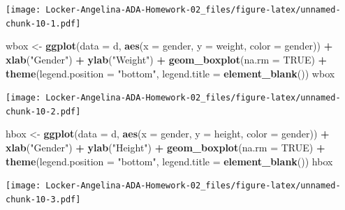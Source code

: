 \documentclass[]{article}
\newenvironment{Shaded}{\begin{snugshade}}{\end{snugshade}}
\newcommand{\KeywordTok}[1]{\textcolor[rgb]{0.13,0.29,0.53}{\textbf{#1}}}
\newcommand{\DataTypeTok}[1]{\textcolor[rgb]{0.13,0.29,0.53}{#1}}
\newcommand{\StringTok}[1]{\textcolor[rgb]{0.31,0.60,0.02}{#1}}
\newcommand{\OtherTok}[1]{\textcolor[rgb]{0.56,0.35,0.01}{#1}}
\newcommand{\OperatorTok}[1]{\textcolor[rgb]{0.81,0.36,0.00}{\textbf{#1}}}
\newcommand{\NormalTok}[1]{#1}
\begin{document}
\texttt{[image: Locker-Angelina-ADA-Homework-02\_files/figure-latex/unnamed-chunk-10-1.pdf]}

\begin{Shaded}
\begin{Highlighting}[]
\NormalTok{wbox <-}\StringTok{ }\KeywordTok{ggplot}\NormalTok{(}\DataTypeTok{data =}\NormalTok{ d, }\KeywordTok{aes}\NormalTok{(}\DataTypeTok{x =}\NormalTok{ gender, }\DataTypeTok{y =}\NormalTok{ weight, }\DataTypeTok{color =}\NormalTok{ gender)) }\OperatorTok{+}\StringTok{ }\KeywordTok{xlab}\NormalTok{(}\StringTok{"Gender"}\NormalTok{) }\OperatorTok{+}\StringTok{ }\KeywordTok{ylab}\NormalTok{(}\StringTok{"Weight"}\NormalTok{) }\OperatorTok{+}\StringTok{ }\KeywordTok{geom_boxplot}\NormalTok{(}\DataTypeTok{na.rm =} \OtherTok{TRUE}\NormalTok{) }\OperatorTok{+}\StringTok{ }\KeywordTok{theme}\NormalTok{(}\DataTypeTok{legend.position =} \StringTok{"bottom"}\NormalTok{, }\DataTypeTok{legend.title =} \KeywordTok{element_blank}\NormalTok{())}
\NormalTok{wbox}
\end{Highlighting}
\end{Shaded}

\texttt{[image: Locker-Angelina-ADA-Homework-02\_files/figure-latex/unnamed-chunk-10-2.pdf]}

\begin{Shaded}
\begin{Highlighting}[]
\NormalTok{hbox <-}\StringTok{ }\KeywordTok{ggplot}\NormalTok{(}\DataTypeTok{data =}\NormalTok{ d, }\KeywordTok{aes}\NormalTok{(}\DataTypeTok{x =}\NormalTok{ gender, }\DataTypeTok{y =}\NormalTok{ height, }\DataTypeTok{color =}\NormalTok{ gender)) }\OperatorTok{+}\StringTok{ }\KeywordTok{xlab}\NormalTok{(}\StringTok{"Gender"}\NormalTok{) }\OperatorTok{+}\StringTok{ }\KeywordTok{ylab}\NormalTok{(}\StringTok{"Height"}\NormalTok{) }\OperatorTok{+}\StringTok{ }\KeywordTok{geom_boxplot}\NormalTok{(}\DataTypeTok{na.rm =} \OtherTok{TRUE}\NormalTok{) }\OperatorTok{+}\StringTok{ }\KeywordTok{theme}\NormalTok{(}\DataTypeTok{legend.position =} \StringTok{"bottom"}\NormalTok{, }\DataTypeTok{legend.title =} \KeywordTok{element_blank}\NormalTok{())}
\NormalTok{hbox}
\end{Highlighting}
\end{Shaded}

\texttt{[image: Locker-Angelina-ADA-Homework-02\_files/figure-latex/unnamed-chunk-10-3.pdf]}
\end{document}
